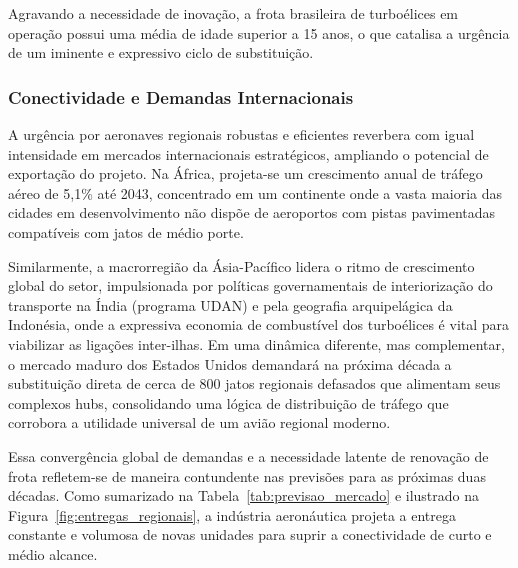 Agravando a necessidade de inovação, a frota brasileira de turboélices em operação possui uma média de idade superior a 15 anos, o que catalisa a urgência de um iminente e expressivo ciclo de substituição.

\subsubsection{Conectividade e Demandas Internacionais}

A urgência por aeronaves regionais robustas e eficientes reverbera com igual intensidade em mercados internacionais estratégicos, ampliando o potencial de exportação do projeto. Na África, projeta-se um crescimento anual de tráfego aéreo de 5,1\% até 2043, concentrado em um continente onde a vasta maioria das cidades em desenvolvimento não dispõe de aeroportos com pistas pavimentadas compatíveis com jatos de médio porte. 

Similarmente, a macrorregião da Ásia-Pacífico lidera o ritmo de crescimento global do setor, impulsionada por políticas governamentais de interiorização do transporte na Índia (programa UDAN) e pela geografia arquipelágica da Indonésia, onde a expressiva economia de combustível dos turboélices é vital para viabilizar as ligações inter-ilhas. Em uma dinâmica diferente, mas complementar, o mercado maduro dos Estados Unidos demandará na próxima década a substituição direta de cerca de 800 jatos regionais defasados que alimentam seus complexos hubs, consolidando uma lógica de distribuição de tráfego que corrobora a utilidade universal de um avião regional moderno.

Essa convergência global de demandas e a necessidade latente de renovação de frota refletem-se de maneira contundente nas previsões para as próximas duas décadas. Como sumarizado na Tabela~\ref{tab:previsao_mercado} e ilustrado na Figura~\ref{fig:entregas_regionais}, a indústria aeronáutica projeta a entrega constante e volumosa de novas unidades para suprir a conectividade de curto e médio alcance.

